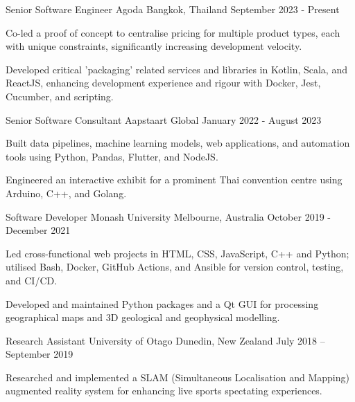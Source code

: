 


\begin{cventries}
  \cventry
    {Senior Software Engineer}
    {Agoda}
    {Bangkok, Thailand}
    {September 2023 - Present}
    {
      \begin{cvitems}
        \item {Co-led a proof of concept to centralise pricing for multiple product types, each with unique constraints, significantly increasing development velocity.}
        \item {Developed critical 'packaging' related services and libraries in Kotlin, Scala, and ReactJS, enhancing development experience and rigour with Docker, Jest, Cucumber, and scripting.}
      \end{cvitems}
    }

  \cventry
    {Senior Software Consultant}
    {Aapstaart}
    {Global}
    {January 2022 - August 2023}
    {
      \begin{cvitems}
        \item {Built data pipelines, machine learning models, web applications, and automation tools using Python, Pandas, Flutter, and NodeJS.}
        \item {Engineered an interactive exhibit for a prominent Thai convention centre using Arduino, C++, and Golang.}
      \end{cvitems}
    }

  \cventry
    {Software Developer}
    {Monash University}
    {Melbourne, Australia}
    {October 2019 - December 2021}
    {
      \begin{cvitems}
        \item {Led cross-functional web projects in HTML, CSS, JavaScript, C++ and Python; utilised Bash, Docker, GitHub Actions, and Ansible for version control, testing, and CI/CD.}
        \item {Developed and maintained Python packages and a Qt GUI for processing geographical maps and 3D geological and geophysical modelling.}
      \end{cvitems}
    }

  \cventry
    {Research Assistant}
    {University of Otago}
    {Dunedin, New Zealand}
    {July 2018 – September 2019}
    {
      \begin{cvitems}
        \item {Researched and implemented a SLAM (Simultaneous Localisation and Mapping) augmented reality system for enhancing live sports spectating experiences.}
      \end{cvitems}
    }
\end{cventries}

